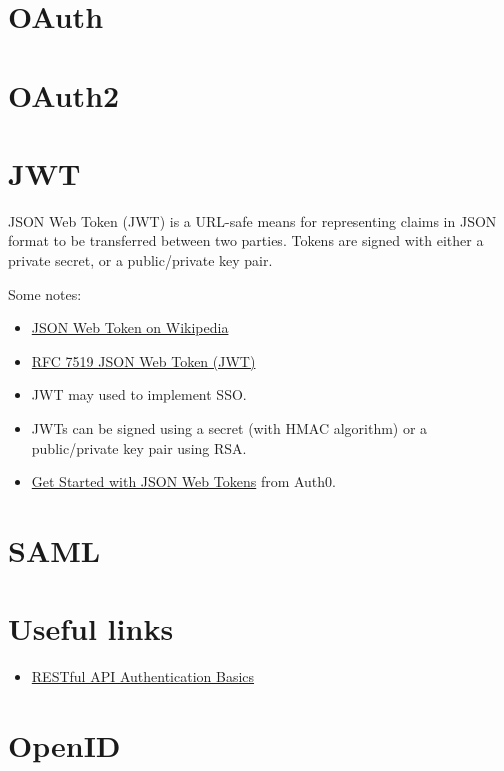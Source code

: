 \documentclass{article}
\begin{document}
\section{OAuth}


\section{OAuth2}


\section{JWT}

JSON Web Token (JWT) is a URL-safe means for representing
claims in JSON format to be transferred between two parties.
Tokens are signed with either a private secret, or a public/private
key pair.

Some notes:

\begin{itemize}
  \item \href{https://en.wikipedia.org/wiki/JSON_Web_Token}{%
     JSON Web Token on Wikipedia}
  \item \href{https://tools.ietf.org/html/rfc7519}{%
     RFC 7519 JSON Web Token (JWT)}
 \item JWT may used to implement SSO.
 \item JWTs can be signed using a secret (with HMAC algorithm) or a
   public/private key pair using RSA.
 \item \href{https://auth0.com/learn/json-web-tokens/}{%
Get Started with JSON Web Tokens} from Auth0.
\end{itemize}


\section{SAML}

\section{Useful links}

\begin{itemize}
  \item \href{https://blog.restcase.com/restful-api-authentication-basics/}{%
      RESTful API Authentication Basics}
\end{itemize}


\section{OpenID}
\end{document}
